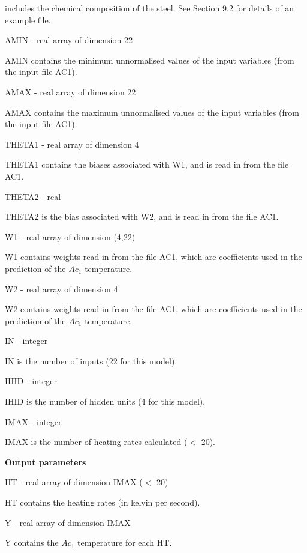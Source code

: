 includes the chemical \indent composition of the steel. See Section 9.2 for details
of an example file.
\medskip
\item {} AMIN - real array of dimension 22
\item {} \indent AMIN contains the minimum unnormalised values of the input
variables (from the \indent input file AC1).
\medskip
\item {} AMAX - real array of dimension 22
\item {} \indent AMAX contains the maximum unnormalised values of the input 
variables (from the \indent input file AC1).
\medskip
\item {} THETA1 - real array of dimension 4
\item {} \indent THETA1 contains the biases associated with W1, and is
read in from the file AC1.
\medskip
\item {} THETA2 - real 
\item {} \indent THETA2 is the bias associated with W2, and is read
in from the file AC1.
\medskip
\item {} W1 - real array of dimension (4,22)
\item {} \indent W1 contains weights read in from the file AC1, which are
coefficients used in the \indent prediction of the $Ac_1$ temperature.
\medskip
\item {} W2 - real array of dimension 4
\item {} \indent W2 contains weights read in from the file AC1, which are
coefficients used in the \indent  prediction of the $Ac_1$ temperature.
\medskip
\item {} IN - integer
\item {} \indent IN is the number of inputs (22 for this model).
\medskip
\item {} IHID - integer
\item {} \indent IHID is the number of hidden units (4 for this model).
\medskip
\item {} IMAX - integer
\item {} \indent IMAX is the number of heating rates calculated ($<$ 20).
\item {} {\bf Output parameters}
\bigskip
\item {} HT - real array of dimension IMAX ($<$ 20)
\item {} \indent HT contains the heating rates (in kelvin per second).
\medskip
\item {} Y - real array of dimension IMAX
\item {} \indent Y contains the $Ac_1$ temperature for each HT.
